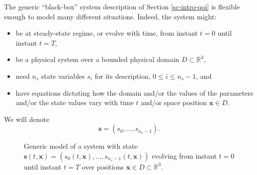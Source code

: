 The generic ``black-box'' system description of Section \ref{sc-intro-qoi} is flexible enough to model many different situations. Indeed, the system might:
\begin{itemize}
\item be at steady-state regime, or evolve with time, from instant $t=0$ until instant $t=T$,
\item be a physical system over a bounded physical domain $D\subset\mathbb{R}^3$,
\item need $n_{s}$ state variables $s_i$ for its description, $0\leqslant i\leqslant n_{s}-1$, and
\item have equations dictating how the domain and/or the values of the parameters and/or the state values vary with time $t$ and/or space position $\mathbf{x}\in D$.
\end{itemize}
We will denote
\begin{equation*}
\mathbf{s} = (s_0,\ldots,s_{n_s-1}).
\end{equation*}

\begin{figure}
\caption{Generic model of a system with state $\mathbf{s}(t,\mathbf{x}) = (s_0(t,\mathbf{x}),\ldots,s_{n_s-1}(t,\mathbf{x}))$
evolving from instant $t=0$ until instant $t=T$
over positions $\mathbf{x}\in D\subset\mathbb{R}^3$.}
\label{fig-state-model}
\end{figure}
